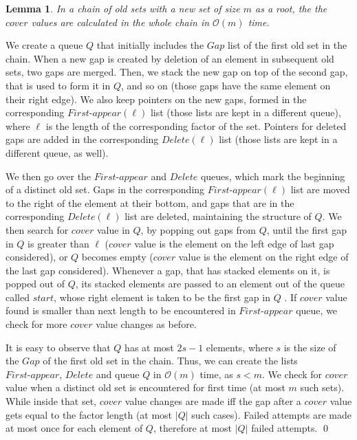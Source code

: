 \documentclass[preprint,12pt]{elsarticle}
\newcommand{\firstappear}{\textit{First-appear}}
\newcommand{\delete}{\mathit{Delete}}
\newcommand{\cO}{\ensuremath{\mathcal{O}}}
\newcommand{\gaplist}{\ensuremath{\mathit{Gap}}}
\newcommand{\covervalue}{\ensuremath{\mathit{cover}}}
\newtheorem{lemma}[theorem]{Lemma}
\newenvironment{proof}[1][Proof]{\begin{trivlist}
\item[\hskip \labelsep {\bfseries #1}]}{\end{trivlist}}
\begin{document}
\begin{lemma}
\label{lemma cover in old sets}
In a chain of old sets with a new set of size $m$ as a root, the the $\covervalue$ values are calculated in the whole chain in $\cO(m)$ time.
\end{lemma}
\begin{proof}
We create a queue $Q$ that initially includes the $\gaplist$ list of the first old set in the chain.
When a new gap is created by deletion of an element in subsequent old sets, two gaps are merged.
Then, we stack the new gap on top of the second gap, that is used to form it in $Q$, and so on
(those gaps have the same element on their right edge).
We also keep pointers on the new gaps, formed in the corresponding $\firstappear(\ell)$ list (those lists are kept in a different queue),
where $\ell$ is the length of the corresponding factor of the set.
Pointers for deleted gaps are added in the corresponding $\delete(\ell)$ list (those lists are kept in a different queue, as well).

We then go over the $\firstappear$ and $\delete$ queues, which mark the beginning of a distinct old set.
Gaps in the corresponding $\firstappear(\ell)$ list are moved to the right of the element at their bottom,
and gaps that are in the corresponding $\delete(\ell)$ list are deleted, maintaining the structure of $Q$.
We then search for $\covervalue$ value in $Q$, by popping out gaps from $Q$, until the first gap in $Q$ is greater
than $\ell$ ($\covervalue$ value is the element on the left edge of last gap considered),
or $Q$ becomes empty ($\covervalue$ value is the element on the right edge of the last gap considered).
Whenever a gap, that has stacked elements on it, is popped out of $Q$, its stacked elements are passed
to an element out of the queue called $start$, whose right element is taken to be the first gap in $Q$ .
If $\covervalue$ value found is smaller than next length to be encountered in $\firstappear$ queue,
we check for more $\covervalue$ value changes as before.

It is easy to observe that $Q$ has at most $2s-1$ elements,
where $s$ is the size of the $\gaplist$ of the first old set in the chain. 
Thus, we can create the lists $\firstappear$, 
$\delete$ and queue $Q$ in $\cO(m)$ time, as $s < m$.
We check for $\covervalue$ value when a distinct old set is encountered for first time (at most $m$ such sets).
While inside that set, $\covervalue$ value changes are made iff the gap after a $\covervalue$ value 
gets equal to the factor length (at most $|Q|$ such cases).
Failed attempts are made at most once for each element of $Q$, therefore at most $|Q|$ failed attempts.
\qed
\end{proof}
\end{document}
